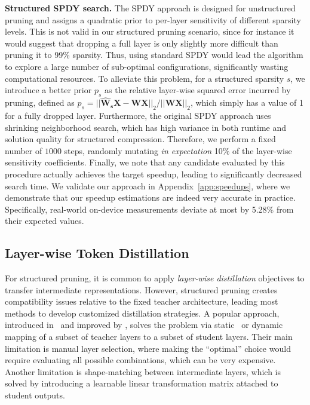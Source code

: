 \documentclass{article}
\theoremstyle{plain}
\theoremstyle{definition}
\theoremstyle{remark}
\renewcommand{\paragraph}[1]{ \noindent \textbf{#1}}
\begin{document}
\paragraph{Structured SPDY search.} The SPDY approach is designed for unstructured pruning and assigns a quadratic prior to per-layer sensitivity of different sparsity levels. This is not valid in our structured pruning scenario, since for instance it would suggest that dropping a full layer is only slightly more difficult than pruning it to 99\% sparsity. Thus, using standard SPDY would lead the algorithm to explore a large number of sub-optimal configurations, significantly wasting computational resources. To alleviate this problem, for a structured sparsity $s$, we introduce a better prior $p_s$ as the relative layer-wise squared error incurred by pruning, defined as  \mbox{$p_s = ||\mathbf{\widehat{W}_s} \mathbf{X} - \mathbf{W} \mathbf{X}||_2 / ||\mathbf{W} \mathbf{X}||_2$},
which simply has a value of 1 for a fully dropped layer. Furthermore, the original SPDY approach uses shrinking neighborhood search, which has high variance in both runtime and solution quality for structured compression. Therefore, we perform a fixed number of $1000$ steps, randomly mutating \textit{in expectation} 10\% of the layer-wise sensitivity coefficients. Finally, we note that any candidate evaluated by this procedure actually achieves the target speedup, leading to significantly decreased search time. We validate our approach in Appendix~\ref{app:speedups}, where we demonstrate that our speedup estimations are indeed very accurate in practice. Specifically, real-world on-device measurements deviate at most by 5.28\% from their expected values. 

\subsection{Layer-wise Token Distillation}

For structured pruning, it is common to apply \emph{layer-wise distillation} objectives to transfer intermediate representations. However, structured pruning creates compatibility issues relative to the fixed teacher architecture, leading most methods to develop customized distillation strategies. 
A popular approach, introduced in~\cite{Jiao2020TinyBERTDB} and improved by \cite{xia2022structured}, solves the problem via static~\cite{Jiao2020TinyBERTDB} or dynamic~\cite{xia2022structured} mapping of a subset of teacher layers to a subset of student layers. 
Their main limitation is manual layer selection, where making the ``optimal'' choice would require evaluating all possible combinations, which can be very expensive. 
Another limitation is shape-matching between intermediate layers, which is solved by introducing a learnable linear transformation matrix attached to student outputs.
\end{document}
